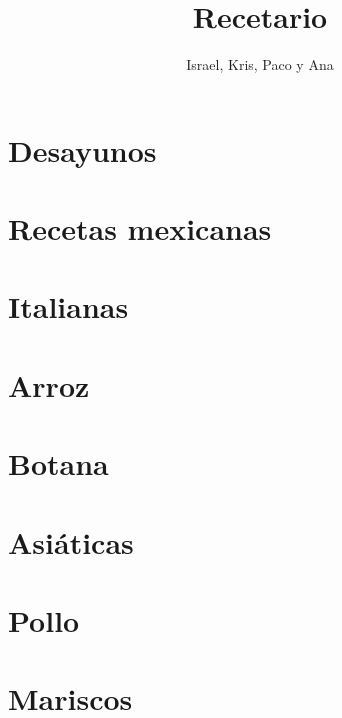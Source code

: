 \documentclass[twoside,12pt]{article}
\date{}
\author{Israel, Kris, Paco y Ana}
\title{Recetario}
\begin{document}
\maketitle

\tableofcontents

\newpage
\section{Desayunos}




\section{Recetas mexicanas}








\section{Italianas}





\section{Arroz}





\section{Botana}


\section{Asi\'aticas}


\section{Pollo}


\section{Mariscos}

\end{document}
